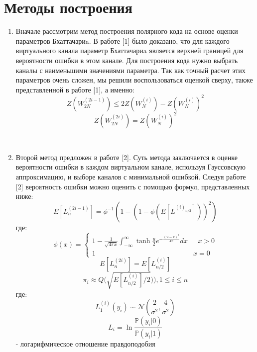 \documentclass{llncs}
\begin{document}
\section{Методы построения}
\begin{enumerate}
\item 
Вначале рассмотрим метод построения полярного кода на основе оценки параметров Бхаттачариa. В работе [1] было доказано, что для каждого виртуального канала параметр Бхаттачариa является верхней границей для вероятности ошибки в этом канале.  Для построения кода нужно выбрать каналы с наименьшими значениями параметра. Так как точный расчет этих параметров очень сложен, мы решили воспользоваться оценкой сверху, также представленной в работе [1], а именно:
\\
\begin{equation}
    Z(W^{(2i-1)}_{2N}) \leq 2Z(W^{(i)}_N) - Z(W^{(i)}_N)^{2}
\end{equation}
\begin{equation}
    Z(W_{2N}^{(2i)}) = Z(W^{(i)}_N)^2
\end{equation}

\\
\item
Второй метод предложен в работе [2]. Суть метода заключается в оценке вероятности ошибки в каждом виртуальном канале, используя Гауссовскую аппроксимацию, и выборе каналов с минимальной ошибкой. Следуя работе [2] вероятность ошибки можно оценить с помощью формул, представленных ниже: 
\begin{equation}
    E[L^{(2i-1)}_n] = \phi^{-1}(1-(1-\phi(E[L^{(i)_{n/2}}]))^2)
\end{equation}
где:
\begin{equation}
\phi(x) = 
 \begin{cases}
   1 - \frac{1}{\sqrt{4\pi x}}\int_{-\infty}^{\infty}\tanh{\frac{u}{2}}e^{-\frac{(u-x)^2}{4x}}dx &\text{ $x > 0 $}\\
   1 &\text{$x=0$}
 \end{cases}
\end{equation}
\begin{equation}
    E[L^{(2i)}_{n}] = E[L^{(i)}_{n/2}]
\end{equation}
\begin{equation}
    \pi_i \approx Q \Bigg(\sqrt{E[L^{(i)}_{n/2}]/2})\Bigg), 1 \leq i \leq n
\end{equation}
где:
\begin{equation}
    L_1^{(i)}(y_i) \sim  \mathcal{N}(\frac{2}{\sigma^2},\frac{4}{\sigma^2})
\end{equation}
\begin{equation}
    L_{i} = \ln{\frac{\mathds{P}(y_i|0)}{\mathds{P}(y_i|1)}}
\end{equation}
- логарифмическое отношение правдоподобия 
\end{enumerate}
\end{document}
